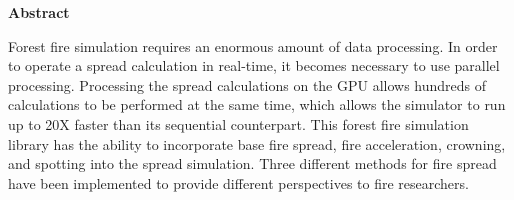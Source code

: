 \newpage
{}
\begin{center}
  {\bf Abstract}
\end{center}

Forest fire simulation requires an enormous amount of data processing. In order to operate a spread calculation in real-time, it becomes necessary to use parallel processing. Processing the spread calculations on the GPU allows hundreds of calculations to be performed at the same time, which allows the simulator to run up to 20X faster than its sequential counterpart. This forest fire simulation library has the ability to incorporate base fire spread, fire acceleration, crowning, and spotting into the spread simulation. Three different methods for fire spread have been implemented to provide different perspectives to fire researchers. 